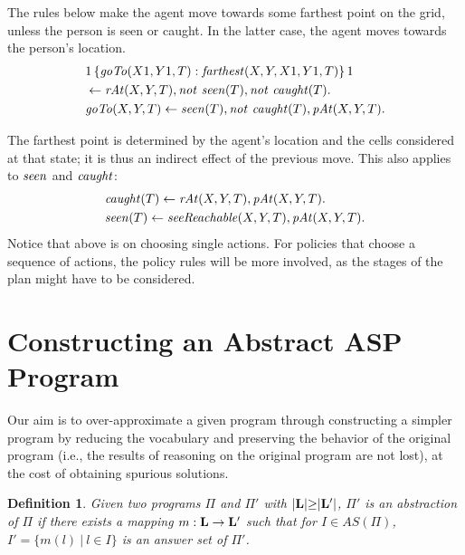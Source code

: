 \documentclass{new_tlp}
\newcommand{\nqbls}{\vspace*{-0.25\baselineskip}}
\newcommand{\nhbls}{\vspace*{-0.5\baselineskip}}
\def\mi#1{\mathit{#1\/}}
\def\beq{\begin{equation}}
\def\eeq#1{\label{#1}\end{equation}}
\newtheorem{defn}{Definition}
\begin{document}
The rules below make the agent move towards some farthest point on the grid, unless the person is seen or caught. 
In the latter case, the agent moves towards the person's location. 
\begin{equation}
 \begin{split}
&1\,\{\mi{goTo}(X1,Y1,T) : \mi{farthest}(X,Y,X1,Y1,T)\}\,1\\%
& \leftarrow \mi{rAt}(X,Y,T), \mi{not\ seen}(T), \mi{not\ caught}(T).\\%
&\mi{goTo}(X,Y,T) \leftarrow \mi{seen}(T), \mi{not\ caught}(T), \mi{pAt}(X,Y,T). 
\end{split}
\label{eq:pol_formula}
\raisetag{24pt}
\end{equation} 
\nqbls

%
\noindent The farthest point is determined by the agent's location and the
cells considered at that state;
it is thus an indirect effect of
the previous move.
This also applies to $\mi{seen}$ and $\mi{caught}$:
\nqbls
\beq \begin{split}
&\mi{caught}(T) \leftarrow \mi{rAt}(X,Y,T), \mi{pAt}(X,Y,T).\\%
&\mi{seen}(T) \leftarrow \mi{seeReachable}(X,Y,T), \mi{pAt}(X,Y,T).
\end{split}
\raisetag{26pt}
 \eeq {eq:pol_formula2}
Notice that above is on choosing single actions. For policies that choose a sequence of actions, the policy rules will be more involved, as the stages of the plan might have to be considered.


\section{Constructing an Abstract ASP Program}\label{sec:auto_abs}

Our aim is to over-approximate a given program through constructing a
simpler program by reducing the vocabulary and preserving the behavior
of the original program (i.e., the
results of reasoning on the original program are not lost), 
at the cost of obtaining spurious
solutions. 


\begin{defn}
Given two programs $\Pi$ and $\Pi'$ with $|{\bf L}|{\geq}|{\bf L}'|$, $\Pi'$ is an \emph{abstraction} of $\Pi$ if there exists a mapping $m : {\bf L} \rightarrow {\bf L'}$ such that for $I\in AS(\Pi)$, $I'=\{m(l) ~|~ l \in I\}$ is an answer set of $\Pi'$.
\end{defn}
\end{document}
